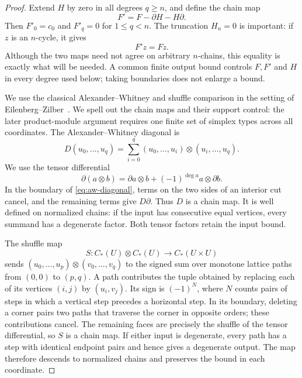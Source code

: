 \begin{proof}
Extend $H$ by zero in all degrees $q\ge n$, and define the chain map
\[
 F'=F-\partial H-H\partial.
\]
Then $F'_0=c_0$ and $F'_q=0$ for $1\le q<n$.  The truncation $H_n=0$
is important: if $z$ is an $n$-cycle, it gives
\begin{equation}\label{eq:truncated-homotopy}
 F'z=Fz.
\end{equation}
Although the two maps need not agree on arbitrary $n$-chains, this
equality is exactly what will be needed.  A common finite output
bound controls $F,F'$ and $H$ in every degree used below; taking
boundaries does not enlarge a bound.

We use the classical Alexander--Whitney and shuffle comparison in the
setting of Eilenberg--Zilber~\cite{EilenbergZilber1953}.  We spell out
the chain maps and their support control: the later product-module
argument requires one finite set of simplex types across all
coordinates.  The Alexander--Whitney diagonal is
\begin{equation}\label{eq:aw-diagonal}
 D(u_0,\ldots,u_q)
   =\sum_{i=0}^q
      (u_0,\ldots,u_i)\otimes(u_i,\ldots,u_q).
\end{equation}
We use the tensor differential
\[
 \partial(a\otimes b)=\partial a\otimes b
                   +(-1)^{\deg a}a\otimes\partial b.
\]
In the boundary of \eqref{eq:aw-diagonal}, terms on the two sides of
an interior cut cancel, and the remaining terms give $D\partial$.
Thus $D$ is a chain map.  It is well defined on normalized chains:
if the input has consecutive equal vertices, every summand has a
degenerate factor.  Both tensor factors retain the input bound.

The shuffle map
\[
 S:C_*(U)\otimes C_*(U)\longrightarrow C_*(U\times U)
\]
sends $(u_0,\ldots,u_p)\otimes(v_0,\ldots,v_q)$ to the signed sum
over monotone lattice paths from $(0,0)$ to $(p,q)$.  A path contributes
the tuple obtained by replacing each of its vertices $(i,j)$ by
$(u_i,v_j)$.  Its sign is $(-1)^N$, where $N$ counts pairs of steps
in which a vertical step precedes a horizontal step.  In its
boundary, deleting a corner pairs two paths that traverse the corner
in opposite orders; these contributions cancel.  The remaining
faces are precisely the shuffle of the tensor differential, so $S$
is a chain map.  If either input is degenerate, every path has a
step with identical endpoint pairs and hence gives a degenerate
output.  The map therefore descends to normalized chains and
preserves the bound in each coordinate.


\end{proof}
